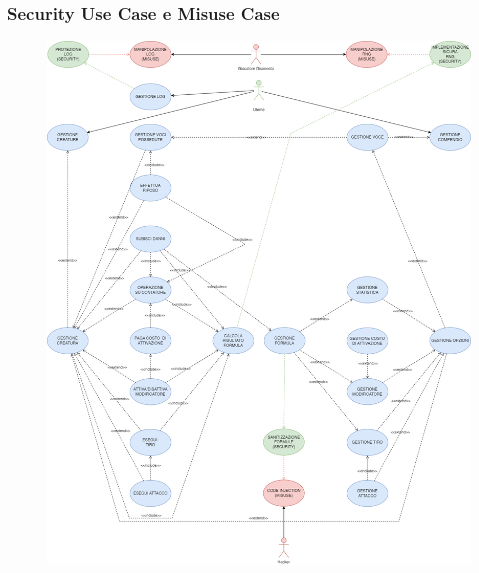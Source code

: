 \documentclass[a4paper, 11pt]{article}
\begin{document}
\subsubsection{Security Use Case e Misuse Case}
\begin{figure}[h!]
    \centering
    \includegraphics[width=1\textwidth,keepaspectratio]{Diagramma CU-Security}
    \label{fig:security}
\end{figure}
\end{document}
